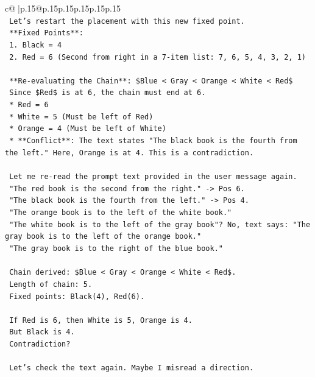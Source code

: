 \documentclass{article}
\begin{document}
{\begin{supertabular}{c@{$\;$}|p{.15\linewidth}@{}p{.15\linewidth}p{.15\linewidth}p{.15\linewidth}p{.15\linewidth}p{.15\linewidth}}
{{{\\ 
\texttt{    Let's restart the placement with this new fixed point.} \\
\texttt{    **Fixed Points**:} \\
\texttt{    1.  Black = 4} \\
\texttt{    2.  Red = 6 (Second from right in a 7{-}item list: 7, 6, 5, 4, 3, 2, 1)} \\
\\ 
\texttt{    **Re{-}evaluating the Chain**: \$Blue < Gray < Orange < White < Red\$} \\
\texttt{    Since \$Red\$ is at 6, the chain must end at 6.} \\
\texttt{    *   Red = 6} \\
\texttt{    *   White = 5 (Must be left of Red)} \\
\texttt{    *   Orange = 4 (Must be left of White)} \\
\texttt{    *   **Conflict**: The text states "The black book is the fourth from the left." Here, Orange is at 4. This is a contradiction.} \\
\\ 
\texttt{    Let me re{-}read the prompt text provided in the user message again.} \\
\texttt{    "The red book is the second from the right." {-}> Pos 6.} \\
\texttt{    "The black book is the fourth from the left." {-}> Pos 4.} \\
\texttt{    "The orange book is to the left of the white book."} \\
\texttt{    "The white book is to the left of the gray book"? No, text says: "The gray book is to the left of the orange book."} \\
\texttt{    "The gray book is to the right of the blue book."} \\
\\ 
\texttt{    Chain derived: \$Blue < Gray < Orange < White < Red\$.} \\
\texttt{    Length of chain: 5.} \\
\texttt{    Fixed points: Black(4), Red(6).} \\
\\ 
\texttt{    If Red is 6, then White is 5, Orange is 4.} \\
\texttt{    But Black is 4.} \\
\texttt{    Contradiction?} \\
\\ 
\texttt{    Let's check the text again. Maybe I misread a direction.} \\
}}}
\end{supertabular}}
\end{document}
